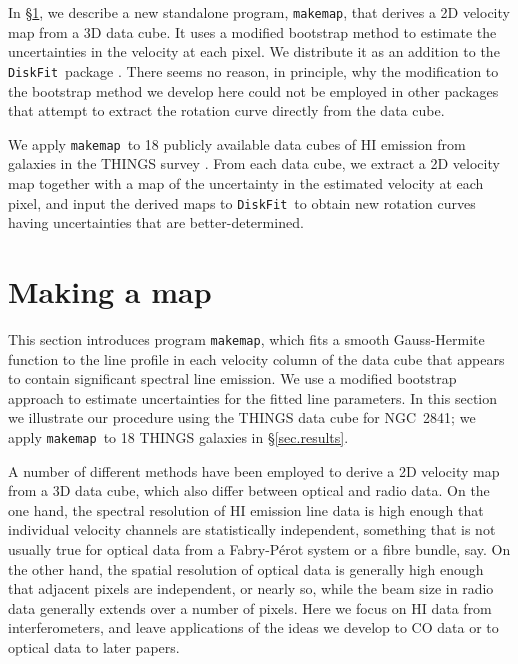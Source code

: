 \documentclass[letterpaper,fleqn,usenatbib]{mnras}
\def\DFt{{\tt DiskFit}}
\def\mkm{{\tt makemap}}
\begin{document}
In \S\ref{sec.makemap}, we describe a new standalone program, \mkm,
that derives a 2D velocity map from a 3D data cube.  It uses a
modified bootstrap method to estimate the uncertainties in the
velocity at each pixel.  We distribute it as an addition to the
\DFt\ package \citep{SS15}.  There seems no reason, in principle, why
the modification to the bootstrap method we develop here could not be
employed in other packages that attempt to extract the rotation curve
directly from the data cube.

We apply \mkm\ to 18 publicly available data cubes of HI emission
from galaxies in the THINGS survey \citep{Wa08}.  From each data cube,
we extract a 2D velocity map together with a map of the uncertainty in
the estimated velocity at each pixel, and input the derived maps to
\DFt\ to obtain new rotation curves having uncertainties that are
better-determined.

\section{Making a map}
\label{sec.makemap}
This section introduces program \mkm, which fits a smooth
Gauss-Hermite function to the line profile in each velocity column of
the data cube that appears to contain significant spectral line
emission.  We use a modified bootstrap approach to estimate
uncertainties for the fitted line parameters.  In this section we
illustrate our procedure using the THINGS data cube for NGC~2841;
we apply \mkm\ to 18 THINGS galaxies in \S\ref{sec.results}.

A number of different methods have been employed to derive a 2D velocity map
from a 3D data cube, which also differ between optical and radio data.
On the one hand, the spectral resolution of HI emission line
data is high enough that individual velocity channels are
statistically independent, something that is not usually true for
optical data from a Fabry-P\'erot system or a fibre bundle, say.  On
the other hand, the spatial resolution of optical data is generally
high enough that adjacent pixels are independent, or nearly so, while
the beam size in radio data generally extends over a number of pixels.
Here we focus on HI data from interferometers, and leave
applications of the ideas we develop to CO data or to optical data to
later papers.
\end{document}
